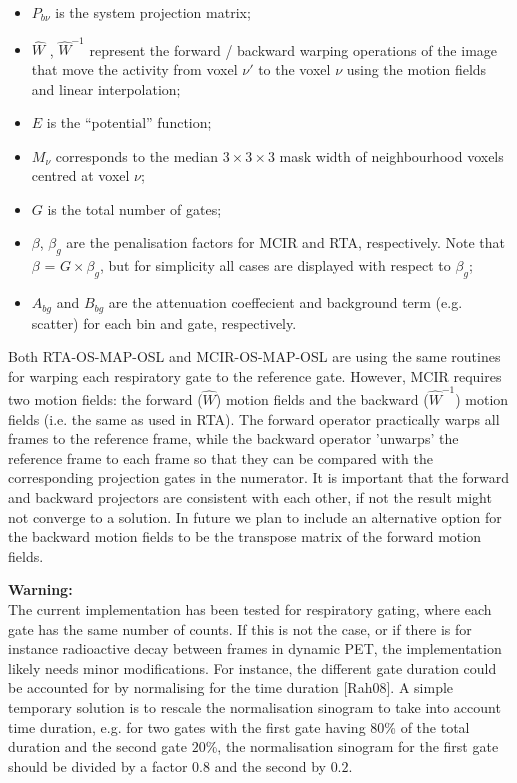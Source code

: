\documentclass{article}
\begin{document}
{{{\begin{itemize}
\item $P_{b\nu}$ is the system projection matrix;

\item $\hat{W}$ , $\hat{W}^{-1}$ represent the forward / backward warping operations of the image that move the activity from voxel $\nu'$ to the voxel $\nu$ using the motion fields and linear interpolation;

\item $E$ is the ``potential'' function;

\item $M_{\nu}$ corresponds to the median $3\times3\times3$ mask width of neighbourhood voxels centred at voxel $\nu$;

\item $G$ is the total number of gates;

\item $\beta$, $\beta_{g}$ are the penalisation factors for MCIR and RTA, respectively. Note that $\beta$ = $G\times\beta_{g}$, but for simplicity all cases are displayed with respect to $\beta_{g}$;

\item $A_{bg}$ and $B_{bg}$ are the attenuation coeffecient and background term (e.g. scatter) for each bin and gate, respectively.
\end{itemize}

Both RTA-OS-MAP-OSL and MCIR-OS-MAP-OSL are using the same routines for warping each respiratory gate to
the reference gate. However, MCIR requires two motion fields: the forward ($\hat{W}$) motion fields and the
backward ($\hat{W}^{-1}$) motion fields (i.e. the same as used in RTA). The forward operator practically warps all
frames to the reference frame, while the backward operator 'unwarps' the reference frame to each frame so
that they can be compared with the corresponding projection gates in the numerator. It is important that
the forward and backward projectors are consistent with each other, if not the result might not converge
to a solution. In future we plan to include an alternative option for the backward motion fields to be
the transpose matrix of the forward motion fields.

\noindent \textbf{Warning:}\\
The current implementation has been tested for respiratory gating, where each gate has the same number of
counts. If this is not the case, or if there is for instance radioactive decay between frames in dynamic
PET, the implementation likely needs minor modifications. For instance, the different gate duration could
be accounted for by normalising for the time duration [Rah08].
A simple temporary solution is to rescale the
normalisation sinogram to take into account time duration, e.g. for two
gates with the first gate having $80$\% of the total duration and the second
gate $20$\%, the normalisation sinogram for the first gate should be divided
by a factor $0.8$ and the second by $0.2$.



}}}
\end{document}
